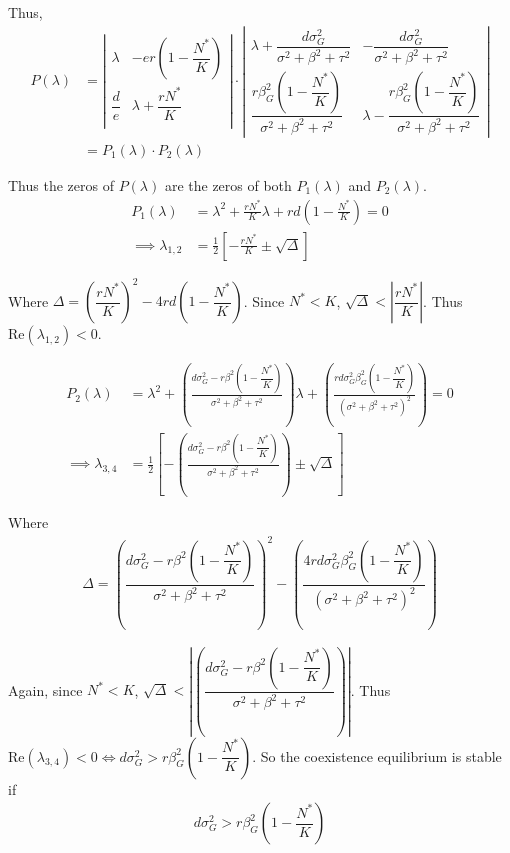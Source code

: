 \documentclass[10pt]{beamer}
\begin{document}
\noindent Thus,
\begin{align*}
	P(\lambda) &= \left|
	\begin{array}{cc}
		\lambda & -er\left(1 - \dfrac{N^*}{K}\right) \\[.4cm]
		\dfrac{d}{e} & \lambda + \dfrac{rN^*}{K} \\
	\end{array}
	\right| \cdot \left|
	\begin{array}{cc}
		\lambda + \dfrac{d\sigma_G^2 }{\sigma^2 + \beta^2 + \tau^2} & -\dfrac{d\sigma_G^2 }{\sigma^2 + \beta^2 + \tau^2} \\[.4cm]
		\dfrac{r\beta_G^2\left(1 - \dfrac{N^*}{K}\right)}{\sigma^2 + \beta^2 + \tau^2} & \lambda - \dfrac{r\beta_G^2\left(1 - \dfrac{N^*}{K}\right)}{\sigma^2 + \beta^2 + \tau^2}	
	\end{array}
	\right| \\[.2cm]
	&= P_1(\lambda)\cdot P_2(\lambda)
\end{align*}

\noindent Thus the zeros of $P(\lambda)$ are the zeros of both $P_1(\lambda)$ and $P_2(\lambda)$.
\begin{align*}
	P_1(\lambda) &= \lambda^2 + \frac{rN^*}{K}\lambda + rd\left(1 - \frac{N^*}{K}\right) = 0 \\
	\implies \lambda_{1,2} &= \frac{1}{2}\left[-\frac{rN^*}{K} \pm \sqrt{\Delta}\right]
\end{align*}

\noindent Where $\Delta = \left(\dfrac{rN^*}{K}\right)^2 - 4rd\left(1 - \dfrac{N^*}{K}\right)$.  Since $N^* < K$, $\sqrt{\Delta} < \left|{\dfrac{rN^*}{K}}\right|$.  Thus $\text{Re} (\lambda_{1,2}) < 0$.

\begin{align*}
	P_2(\lambda) &= \lambda^2 + \left(\frac{d\sigma_G^2-r\beta^2\left(1 - \dfrac{N^*}{K}\right)}{\sigma^2 + \beta^2 + \tau^2}\right)\lambda + \left(\frac{rd\sigma_G^2\beta_G^2\left(1 - \dfrac{N^*}{K}\right)}{(\sigma^2 + \beta^2 + \tau^2)^2}\right) = 0 \\
	\implies \lambda_{3,4} &= \frac{1}{2}\left[-\left(\frac{d\sigma_G^2-r\beta^2\left(1 - \dfrac{N^*}{K}\right)}{\sigma^2 + \beta^2 + \tau^2}\right) \pm \sqrt{\Delta}\right]
\end{align*}

\noindent Where
\begin{align*}
	\Delta = \left(\dfrac{d\sigma_G^2-r\beta^2\left(1 - \dfrac{N^*}{K}\right)}{\sigma^2 + \beta^2 + \tau^2}\right)^2 - \left(\dfrac{4rd\sigma_G^2\beta_G^2\left(1 - \dfrac{N^*}{K}\right)}{(\sigma^2 + \beta^2 + \tau^2)^2}\right)
\end{align*} 

\noindent Again, since $N^* < K$, $\sqrt{\Delta} < \left|\left(\dfrac{d\sigma_G^2-r\beta^2\left(1 - \dfrac{N^*}{K}\right)}{\sigma^2 + \beta^2 + \tau^2}\right)\right|$. Thus $\text{Re} (\lambda_{3,4}) < 0 \iff d\sigma_G^2 > r\beta_G^2\left(1 - \dfrac{N^*}{K}\right)$.  So the coexistence equilibrium is stable if 
\begin{align*}
	d\sigma_G^2 > r\beta_G^2\left(1 - \dfrac{N^*}{K}\right)
\end{align*}
\end{document}
